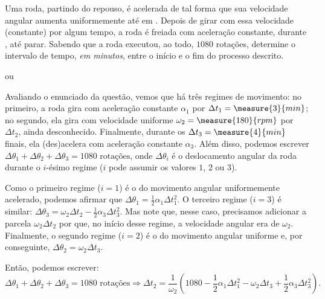 \begin{question}
    Uma roda, partindo do repouso, é acelerada de tal forma que sua velocidade angular aumenta uniformemente até  em .
    Depois de girar com essa velocidade (constante) por algum tempo, a roda é freiada com aceleração constante, durante , até parar.
    Sabendo que a roda executou, ao todo, $1080$ rotações, determine o intervalo de tempo, \emph{em minutos}, entre o início e o fim do processo descrito.

    \begin{answer}
         ou 
    \end{answer}

    \begin{solution}
        Avaliando o enunciado da questão, vemos que há três regimes de movimento: no primeiro, a roda gira com aceleração constante $\alpha_1$ por $\Delta t_1 = \measure{3}{min}$; no segundo, ela gira com velocidade uniforme $\omega_2 = \measure{180}{rpm}$ por $\Delta t_2$, ainda desconhecido.
        Finalmente, durante os $\Delta t_3 = \measure{4}{min}$ finais, ela (des)acelera com aceleração constante $\alpha_3$.
        Além disso, podemos escrever $\Delta\theta_1 + \Delta\theta_2 + \Delta\theta_3 = \text{1080 rotações}$, onde $\Delta\theta_i$ é o deslocamento angular da roda durante o $i$-ésimo regime ($i$ pode assumir os valores $1$, $2$ ou $3$).

        Como o primeiro regime ($i = 1$) é o do movimento angular uniformemente acelerado, podemos afirmar que $\Delta\theta_1 = \frac{1}{2} \alpha_1 \Delta t_1^2$.
        O terceiro regime ($i = 3$) é similar: $\Delta\theta_3 = \omega_2 \Delta t_2 - \frac{1}{2} \alpha_3 \Delta t_3^2$.
        Mas note que, nesse caso, precisamos adicionar a parcela $\omega_2 \Delta t_2$ por que, no início desse regime, a velocidade angular era de $\omega_2$.
        Finalmente, o segundo regime ($i = 2$) é o do movimento angular uniforme e, por conseguinte, $\Delta\theta_2 = \omega_2 \Delta t_3$.

        Então, podemos escrever:
        \begin{equation}\label{eq:dt2}
            \Delta\theta_1 + \Delta\theta_2 + \Delta\theta_3 = \text{1080 rotações}
                \Rightarrow
            \Delta t_2 = \frac{1}{\omega_2}\left(1080 - \frac{1}{2} \alpha_1 \Delta t_1^2 - \omega_2 \Delta t_3 + \frac{1}{2} \alpha_3 \Delta t_3^2\right).
        \end{equation}


\end{solution}
\end{question}
